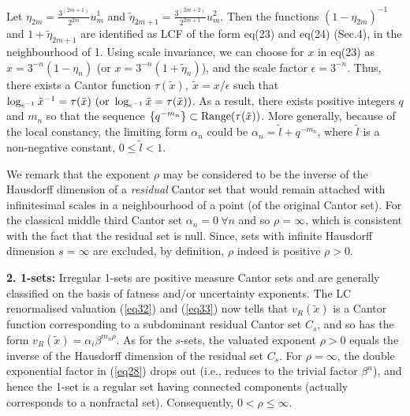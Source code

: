 \documentclass[12pt]{article}
\begin{document}
\vspace{.3cm}

Let $\eta_{2m}={\frac{3^{(2m+1)}}{2^{2m}}} u^1_m$ and $\tilde \eta_{2m+1} = {\frac{3^{(2m+2)}}{2^{2m+1}}} u^2_m$. Then the functions $(1-\eta_{2m})^{-1}$ and $1+\tilde \eta_{2m+1}$ are identified as LCF of the form eq(23) and eq(24) (Sec.4), in the neighbourhood of 1. Using scale invariance, we can choose for $x$ in eq(23) as $x=3^{-n}(1-\eta_{n})$ (or $x=3^{-n}(1+\tilde\eta_{n})$), and the scale factor $\epsilon=3^{-n}$. Thus, there exists a Cantor function $\tau(\tilde x), \ \tilde x=x/\epsilon$ such that $\log_{\epsilon^{-1}} \tilde x^{-1}=\tau(\tilde x) \ ( {\rm or} \ \log_{\epsilon^{-1}} \tilde x=\tau(\tilde x))$. As a result, there exists positive integers $q$ and $m_n$ so that the sequence $\{q^{-m_n}\}\subset {\rm Range} (\tau(\tilde x))$. More generally, because of the local constancy, the limiting form $\alpha_n$ could be $\alpha_n = \tilde l + q^{-m_n}$, where $\tilde l$ is a non-negative constant, $0\leq\tilde l <1$.

\vspace{.25cm}

We remark that the exponent $\rho$ may be considered to be the inverse of the Hausdorff dimension of a {\em residual} Cantor set that would remain attached with infinitesimal scales in a neighbourhood of a point (of the original Cantor set). For the classical middle third Cantor set $\alpha_n=0\ \forall n$ and so $\rho=\infty$, which is consistent with the fact that the residual set is null. Since, sets with infinite Hausdorff dimension $s=\infty$ are excluded, by definition, $\rho$ indeed is positive $\rho>0$.

\bigskip
{\bf 2. 1-sets:}  Irregular 1-sets \cite{falc}  are positive measure Cantor sets and are generally classified on the basis of fatness and/or uncertainty exponents. The LC renormalised valuation (\ref{eq32}) and (\ref{eq33}) now tells that $v_R(\tilde x)$ is a Cantor function corresponding to a subdominant residual Cantor set $C_s$, and so has the form $v_R(\tilde x)= \alpha _{i}\beta ^{m_{n}\rho}$.  As for the $s$-sets, the valuated exponent $\rho >0$ equals the inverse of the Hausdorff dimension of the residual set $C_s$. For $\rho=\infty$, the double exponential factor in (\ref{eq28}) drops out (i.e., reduces to the trivial factor $\beta^n$), and hence the 1-set is a regular set \cite{falc} having connected components (actually corresponds to a nonfractal set). Consequently, $0< \rho\leq\infty$.

\vspace{.25cm}
\end{document}
